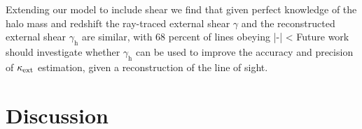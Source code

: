 \documentclass[useAMS,usenatbib]{mn2e}
\begin{document}
Extending our model to include shear we find that given
perfect knowledge of the halo mass and redshift the ray-traced external shear
$\gamma$ and the reconstructed external shear $\gamma_{\mathrm{h}}$  are
similar, with 68 percent of lines obeying
\be
\label{eq:shearineq}
|{\boldmath{\gammax}-}| < 
\ee 
Future work should investigate whether $\gamma_{\mathrm{h}}$ can be used
to improve the accuracy and precision of $\kappa_{\rm ext}$ estimation, given a
reconstruction of the line of sight. 



\section{Discussion}
\label{sec:discuss}

\end{document}
